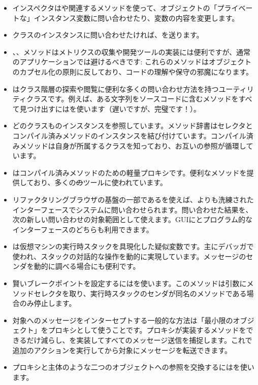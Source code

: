 \documentclass[a4paper,10pt,twoside]{book}
\begin{document}
\begin{itemize}
\item インスペクタはや関連するメソッドを使って、オブジェクトの「プライベートな」インスタンス変数に問い合わせたり、変数の内容を変更します。
\item クラスのインスタンスに問い合わせたければ、を送ります。
\item {}、、\etc メソッドはメトリクスの収集や開発ツールの実装には便利ですが、通常のアプリケーションでは避けるべきです: これらのメソッドはオブジェクトのカプセル化の原則に反しており、コードの理解や保守の邪魔になります。
\item {}はクラス階層の探索や閲覧に便利な多くの問い合わせ方法を持つユーティリティクラスです。例えば、ある文字列をソースコードに含むメソッドをすべて見つけ出すにはを使います（遅いですが、完璧です！）。
\item どのクラスものインスタンスを参照しています。メソッド辞書はセレクタとコンパイル済みメソッドのインスタンスを結び付けています。コンパイル済みメソッドは自身が所属するクラスを知っており、お互いの参照が循環しています。
\item {}はコンパイル済みメソッドのための軽量プロキシです。便利なメソッドを提供しており、多くの\st のツールに使われています。
\item リファクタリングブラウザの基盤の一部であるを使えば、よりも洗練されたインターフェースでシステムに問い合わせられます。問い合わせた結果を、次の新しい問い合わせの対象範囲として使えます。GUIにとプログラム的なインターフェースのどちらも利用できます。
\item {}は仮想マシンの実行時スタックを具現化した疑似変数です。主にデバッガで使われ、スタックの対話的な操作を動的に実現しています。メッセージのセンダを動的に調べる場合にも便利です。
\item 賢いブレークポイントを設定するにはを使います。このメソッドは引数にメソッドセレクタを取り、実行時スタックのセンダが同名のメソッドである場合のみ停止します。
\item 対象へのメッセージをインターセプトする一般的な方法は「最小限のオブジェクト」をプロキシとして使うことです。プロキシが実装するメソッドをできるだけ減らし、を実装してすべてのメッセージ送信を捕捉します。これで追加のアクションを実行してから対象にメッセージを転送できます。
\item プロキシと主体のような二つのオブジェクトへの参照を交換するにはを使います。

\end{itemize}
\end{document}
